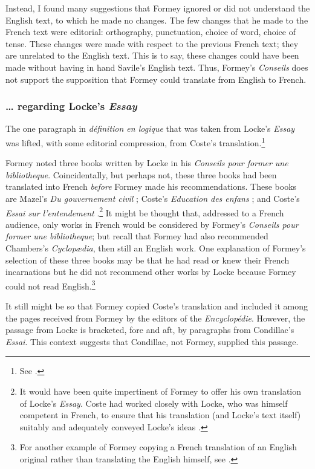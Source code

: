 \documentclass[output=paper]{langscibook}
\begin{document}
Instead, I found many suggestions that Formey ignored or did not understand the English text, to which he made no changes. The few changes that he made to the French text were editorial: orthography, punctuation, choice of word, choice of tense. These changes were made with respect to the previous French text; they are unrelated to the English text. This is to say, these changes could have been made without having in hand Savile’s English text. Thus, Formey’s \emph{Conseils} does not support the supposition that Formey could translate from English to French.

\subsubsection{… regarding Locke’s \textit{Essay}}

The one paragraph in \emph{définition en logique} that was taken from Locke’s \emph{Essay} was lifted, with some editorial compression, from Coste’s translation.\footnote{See \citet[336]{Locke1729}.}  

Formey noted three books written by Locke in his \emph{Conseils pour former une bibliotheque}. Coincidentally, but perhaps not, these three books had been translated into French \emph{before} Formey made his recommendations. These books are Mazel’s \emph{Du gouvernement civil} \citep{Locke1691}; Coste’s \emph{Education des enfans} \citep{Locke1695}; and Coste’s \emph{Essai sur l’entendement} \citep{Locke1700b}.\footnote{It would have been quite impertinent of Formey to offer his own translation of Locke’s \emph{Essay}. Coste had worked closely with Locke, who was himself competent in French, to ensure that his translation (and Locke’s text itself) suitably and adequately conveyed Locke’s ideas \citep{Soulard2011}.}  It might be thought that, addressed to a French audience, only works in French would be considered by Formey’s \emph{Conseils pour former une bibliotheque}; but recall that Formey had also recommended Chambers’s \emph{Cyclopædia}, then still an English work. One explanation of Formey’s selection of these three books may be that he had read or knew their French incarnations but he did not recommend other works by Locke because Formey could not read English.\footnote{For another example of Formey copying a French translation of an English original rather than translating the English himself, see \citet[10]{Coste2009}.}

It still might be so that Formey copied Coste’s translation and included it among the pages received from Formey by the editors of the \emph{Encyclopédie}. However, the passage from Locke is bracketed, fore and aft, by paragraphs from Condillac’s \emph{Essai}. This context suggests that Condillac, not Formey, supplied this passage.
\end{document}
